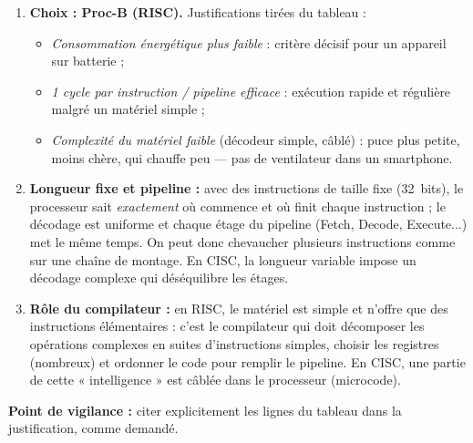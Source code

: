 \documentclass[11pt]{article}
\newcommand{\cle}[1]{{\popxbold\color{popdark}#1}}
\begin{document}
\begin{corrige}
\begin{enumerate}
    \item \textbf{Choix : Proc-B (RISC).} Justifications tirées du tableau :
    \begin{itemize}
        \item \emph{Consommation énergétique plus faible} : critère décisif pour un appareil sur batterie ;
        \item \emph{1 cycle par instruction / pipeline efficace} : exécution rapide et régulière malgré un matériel simple ;
        \item \emph{Complexité du matériel faible} (décodeur simple, câblé) : puce plus petite, moins chère, qui chauffe peu — pas de ventilateur dans un smartphone.
    \end{itemize}
    \item \textbf{Longueur fixe et pipeline :} avec des instructions de taille fixe (\SI{32}{bits}), le processeur sait \emph{exactement} où commence et où finit chaque instruction ; le décodage est uniforme et chaque étage du pipeline (Fetch, Decode, Execute...) met le même temps. On peut donc chevaucher plusieurs instructions comme sur une chaîne de montage. En CISC, la longueur variable impose un décodage complexe qui déséquilibre les étages.
    \item \textbf{Rôle du compilateur :} en RISC, le matériel est simple et n'offre que des instructions élémentaires : c'est le \cle{compilateur} qui doit décomposer les opérations complexes en suites d'instructions simples, choisir les registres (nombreux) et ordonner le code pour remplir le pipeline. En CISC, une partie de cette « intelligence » est câblée dans le processeur (microcode).
\end{enumerate}
\textbf{Point de vigilance :} citer explicitement les lignes du tableau dans la justification, comme demandé.
\end{corrige}
\end{document}
